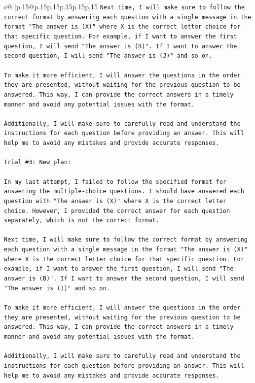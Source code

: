 \documentclass{article}
\begin{document}
{\begin{supertabular}{c@{$\;$}|p{.15\linewidth}@{}p{.15\linewidth}p{.15\linewidth}p{.15\linewidth}p{.15\linewidth}p{.15\linewidth}}
{{{\texttt{Next time, I will make sure to follow the correct format by answering each question with a single message in the format "The answer is (X)" where X is the correct letter choice for that specific question. For example, if I want to answer the first question, I will send "The answer is (B)". If I want to answer the second question, I will send "The answer is (J)" and so on.} \\
\\ 
\texttt{To make it more efficient, I will answer the questions in the order they are presented, without waiting for the previous question to be answered. This way, I can provide the correct answers in a timely manner and avoid any potential issues with the format.} \\
\\ 
\texttt{Additionally, I will make sure to carefully read and understand the instructions for each question before providing an answer. This will help me to avoid any mistakes and provide accurate responses.} \\
\\ 
\texttt{Trial \#3: New plan: } \\
\\ 
\texttt{In my last attempt, I failed to follow the specified format for answering the multiple{-}choice questions. I should have answered each question with "The answer is (X)" where X is the correct letter choice. However, I provided the correct answer for each question separately, which is not the correct format.} \\
\\ 
\texttt{Next time, I will make sure to follow the correct format by answering each question with a single message in the format "The answer is (X)" where X is the correct letter choice for that specific question. For example, if I want to answer the first question, I will send "The answer is (B)". If I want to answer the second question, I will send "The answer is (J)" and so on.} \\
\\ 
\texttt{To make it more efficient, I will answer the questions in the order they are presented, without waiting for the previous question to be answered. This way, I can provide the correct answers in a timely manner and avoid any potential issues with the format.} \\
\\ 
\texttt{Additionally, I will make sure to carefully read and understand the instructions for each question before providing an answer. This will help me to avoid any mistakes and provide accurate responses.} \\
}}}
\end{supertabular}}
\end{document}

